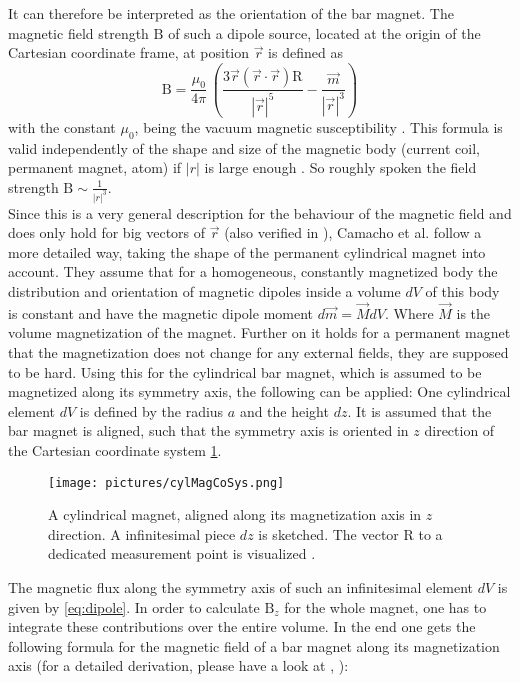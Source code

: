 It can therefore be interpreted as the orientation of the bar magnet. The magnetic field strength $ \mathrm{B} $ of such a dipole source, located at the origin of the Cartesian coordinate frame, at position $ \vec{r} $ is defined as
\begin{equation} \label{eq:dipole}
\mathrm{B} = \frac{\mu_{0}}{4 \pi} \, \left (\frac{3 \vec{r} (\vec{r} \cdot \vec{r})\mathrm{R}}{|\vec{r}|^5} -
		\frac{\vec{m}}{|\vec{r}|^3} \right )
\end{equation}
with the constant $ \mu_{0} $, being the vacuum magnetic susceptibility \cite{camacho2013alternative}. This formula is valid independently of the shape and size of the magnetic body (current coil, permanent magnet, atom) if $ |r| $ is large enough . So roughly spoken the field strength $ \mathrm{B} \sim \frac{1}{|r|^ {3}}$.\\
Since this is a very general description for the behaviour of the magnetic field and does only hold for big vectors of $ \vec{r} $ (also verified in ), Camacho et al. \cite{camacho2013alternative} follow a more detailed way, taking the shape of the permanent cylindrical magnet into account. They assume that for a homogeneous, constantly magnetized body the distribution and orientation of magnetic dipoles inside a volume $ dV $ of this body is constant and have the magnetic dipole moment $ d\vec{m} = \vec{M}dV $. Where $ \vec{M} $ is the volume magnetization of the magnet. Further on it holds for a permanent magnet that the magnetization does not change for any external fields, they are supposed to be hard. Using this for the cylindrical bar magnet, which is assumed to be magnetized along its symmetry axis, the following can be applied: One cylindrical element $ dV $ is defined by the radius $ a $ and the height $ dz $. It is assumed that the bar magnet is aligned, such that the symmetry axis is oriented in $ z $ direction of the Cartesian coordinate system \ref{fig:cylMag}.
\begin{figure}
\centering
\texttt{[image: pictures/cylMagCoSys.png]}
\caption{A cylindrical magnet, aligned along its magnetization axis in $ z $ direction. A infinitesimal piece $ dz $ is sketched. The vector R to a dedicated measurement point is visualized \cite{derby2010cylindrical}.}
\label{fig:cylMag}
\end{figure}
The magnetic flux along the symmetry axis of such an infinitesimal element $ dV $ is given by \ref{eq:dipole}. In order to calculate $ \mathrm{B}_{z} $ for the whole magnet, one has to integrate these contributions over the entire volume. In the end one gets the following formula for the magnetic field of a bar magnet along its magnetization axis (for a detailed derivation, please have a look at \cite{camacho2013alternative}, \cite{derby2010cylindrical}):

